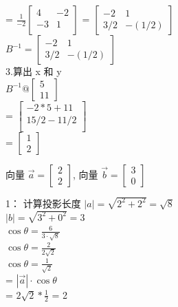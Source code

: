\documentclass[12pt]{article}
\begin{document}
\begin{flushleft}
= $
  \frac{1}{-2}\begin{bmatrix}
   4 & -2 \\
   -3 &  1 \\ 
  \end{bmatrix}
$
= $\begin{bmatrix}
    -2 & 1 \\
    3/2 & -(1/2)
\end{bmatrix}$ \\
$B^{-1} = \begin{bmatrix}
    -2 & 1 \\
    3/2 & -(1/2)
\end{bmatrix}$\\
3.算出 x 和 y \\ 
$B^{-1} @ \begin{bmatrix}
    5 \\ 11
\end{bmatrix}$ \\ 
= $\begin{bmatrix}
    -2 * 5 + 11 \\
    15/2  - 11/2 \\ 
\end{bmatrix}$ \\ 
= $\begin{bmatrix}
    1 \\ 2
\end{bmatrix}$ \\ 
\end{flushleft}

\begin{flushleft}
    向量 $\vec{a} = \begin{bmatrix}
        2 \\ 
        2
    \end{bmatrix}$, 向量 $\vec{b} =  \begin{bmatrix}
        3 \\ 
        0
    \end{bmatrix} $

    1： 计算投影长度
    $|a| = \sqrt{2^{2} + 2^{2}} = \sqrt{8} $ \\
    $|b| = \sqrt{3^{2} + 0^{2}} = 3$ \\ 
    $\cos\theta = \frac{6}{3 \cdot \sqrt{8}}$ \\
    $\cos\theta = \frac{2}{2\sqrt{2}}$ \\ 
    $\cos\theta = \frac{1}{\sqrt{2}}$ \\ 
     
    =
    $|\vec{a}| \cdot \cos\theta$ \\
    = 
    $2\sqrt{2} * \frac{1}{2}$
    = 2

\end{flushleft}
\end{document}
